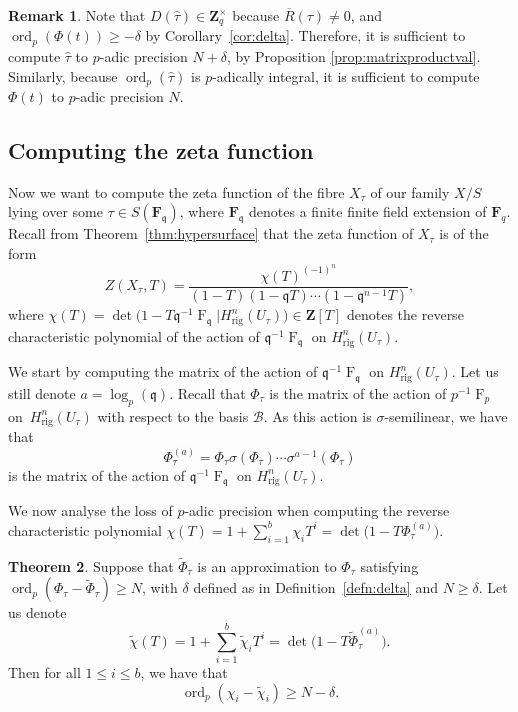 \documentclass[a4paper,11pt]{article}
\numberwithin{equation}{section}
\newcommand{\ZZ}{\mathbf{Z}} %
\newcommand{\FF}{\mathbf{F}} %
\DeclareMathOperator{\ord}{ord}          %
\DeclareMathOperator{\Frob}{F}           %
\providecommand{\Hrig}{H_{\text{rig}}}  %
\providecommand{\cB}{\mathcal{B}} %
\theoremstyle{definition}
\newtheorem{thm}{Theorem}[section]
\newtheorem{rem}[thm]{Remark}
\begin{document}
\begin{rem}
Note that $D(\hat{\tau}) \in \ZZ_q^{\times}$ because $\overline{R}(\tau) \neq 0$, and $\ord_p(\Phi(t)) \geq -\delta$
by Corollary~\ref{cor:delta}. Therefore, it is sufficient to compute $\hat{\tau}$ to $p$-adic precision $N+\delta$, by
Proposition \ref{prop:matrixproductval}. Similarly, because $\ord_p(\hat{\tau})$ is $p$-adically integral, it is
sufficient to compute $\Phi(t)$ to $p$-adic precision $N$.
\end{rem}

\subsection{Computing the zeta function}
\label{sec:ZetaFunctions}

Now we want to compute the zeta function of the fibre $X_{\tau}$ of
our family $X/S$ lying over some $\tau \in S(\FF_{\mathfrak{q}})$, 
where $\FF_{\mathfrak{q}}$ denotes a finite finite field extension of $\FF_q$.  
Recall from Theorem~\ref{thm:hypersurface} 
that the zeta function of $X_{\tau}$ is of the form
\begin{equation*}
Z(X_{\tau},T) = \frac{\chi(T)^{(-1)^n}}{(1 - T) (1 - \mathfrak{q}T) \dotsm (1 - \mathfrak{q}^{n-1}T)},
\end{equation*}
where $\chi(T) = \det \bigl( 1 - T \mathfrak{q}^{-1} \Frob_{\mathfrak{q}} | \Hrig^n(U_{\tau}) \bigr) \in \ZZ[T]$ 
denotes the reverse characteristic polynomial of the action of $\mathfrak{q}^{-1} \Frob_{\mathfrak{q}}$ 
on $\Hrig^n(U_{\tau})$.

We start by computing the matrix of the action of $\mathfrak{q}^{-1} \Frob_{\mathfrak{q}}$ on $\Hrig^n(U_{\tau})$.
Let us still denote $a=\log_p(\mathfrak{q})$. Recall that $\Phi_{\tau}$ is the matrix of the action 
of $p^{-1} \Frob_p$ on~$\Hrig^{n}(U_{\tau})$ with respect to the basis $\cB$. As this action is 
$\sigma$-semilinear, we have that 
\begin{equation*}
\Phi_{\tau}^{(a)} = 
    \Phi_{\tau} \sigma(\Phi_{\tau}) \dotsm \sigma^{a-1}(\Phi_{\tau})
\end{equation*}
is the matrix of the action of $\mathfrak{q}^{-1} \Frob_{\mathfrak{q}}$ on $\Hrig^n(U_{\tau})$. 

We now analyse the loss of $p$-adic precision when computing the reverse characteristic polynomial 
$\chi(T)=1+\sum_{i=1}^b \chi_i T^i=\det\bigl( 1 - T \Phi_{\tau}^{(a)}\bigr)$.

\begin{thm} \label{thm:preccharpoly}
Suppose that $\tilde{\Phi}_{\tau}$ is an approximation to 
$\Phi_{\tau}$ satisfying
$\ord_p (\Phi_{\tau}-\tilde{\Phi}_{\tau}) \geq N$,
with $\delta$ defined as in Definition~\ref{defn:delta} and $N \geq \delta$. Let us denote
\[
\tilde{\chi}(T) = 1 + \sum_{i=1}^b \tilde{\chi}_i T^i 
                = \det\bigl( 1 - T \tilde{\Phi}_{\tau}^{(a)}\bigr).
\]
Then for all $1 \leq i \leq b$, we have that 
\[
\ord_p (\chi_i - \tilde{\chi}_i) \geq N-\delta.
\]
\end{thm}
\end{document}
